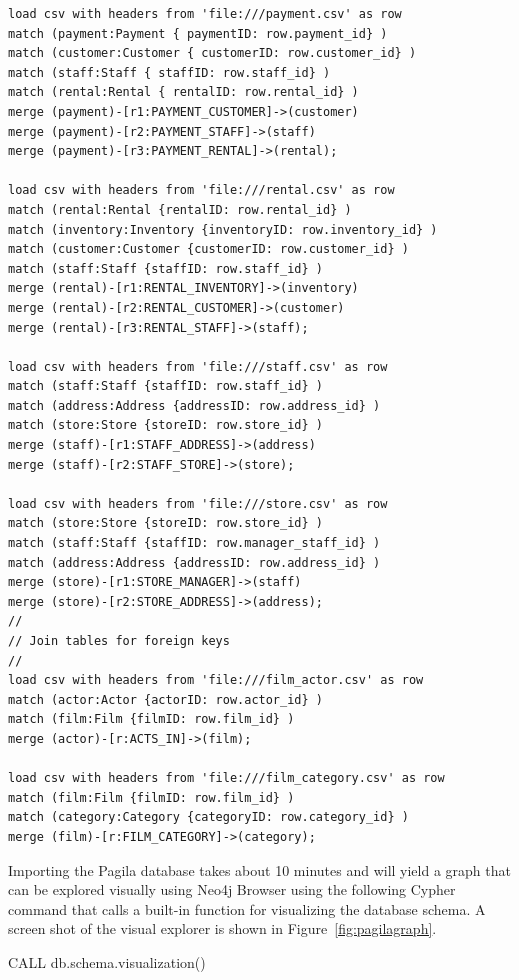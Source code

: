 \begin{withcode}
\begin{verbatim}
load csv with headers from 'file:///payment.csv' as row
match (payment:Payment { paymentID: row.payment_id} )
match (customer:Customer { customerID: row.customer_id} )
match (staff:Staff { staffID: row.staff_id} )
match (rental:Rental { rentalID: row.rental_id} )
merge (payment)-[r1:PAYMENT_CUSTOMER]->(customer)
merge (payment)-[r2:PAYMENT_STAFF]->(staff)
merge (payment)-[r3:PAYMENT_RENTAL]->(rental);

load csv with headers from 'file:///rental.csv' as row
match (rental:Rental {rentalID: row.rental_id} )
match (inventory:Inventory {inventoryID: row.inventory_id} )
match (customer:Customer {customerID: row.customer_id} )
match (staff:Staff {staffID: row.staff_id} )
merge (rental)-[r1:RENTAL_INVENTORY]->(inventory)
merge (rental)-[r2:RENTAL_CUSTOMER]->(customer)
merge (rental)-[r3:RENTAL_STAFF]->(staff);

load csv with headers from 'file:///staff.csv' as row
match (staff:Staff {staffID: row.staff_id} )
match (address:Address {addressID: row.address_id} )
match (store:Store {storeID: row.store_id} )
merge (staff)-[r1:STAFF_ADDRESS]->(address)
merge (staff)-[r2:STAFF_STORE]->(store);

load csv with headers from 'file:///store.csv' as row
match (store:Store {storeID: row.store_id} )
match (staff:Staff {staffID: row.manager_staff_id} )
match (address:Address {addressID: row.address_id} )
merge (store)-[r1:STORE_MANAGER]->(staff)
merge (store)-[r2:STORE_ADDRESS]->(address);
//
// Join tables for foreign keys
//
load csv with headers from 'file:///film_actor.csv' as row
match (actor:Actor {actorID: row.actor_id} )
match (film:Film {filmID: row.film_id} )
merge (actor)-[r:ACTS_IN]->(film);

load csv with headers from 'file:///film_category.csv' as row
match (film:Film {filmID: row.film_id} )
match (category:Category {categoryID: row.category_id} )
merge (film)-[r:FILM_CATEGORY]->(category);
\end{verbatim}
\normalsize

Importing the Pagila database takes about 10 minutes and will yield a graph that can be explored visually using Neo4j Browser using the following Cypher command that calls a built-in function for visualizing the database schema. A screen shot of the visual explorer is shown in Figure~\ref{fig:pagilagraph}.

\begin{cyphercode}
CALL db.schema.visualization()
\end{cyphercode}



\end{withcode}
